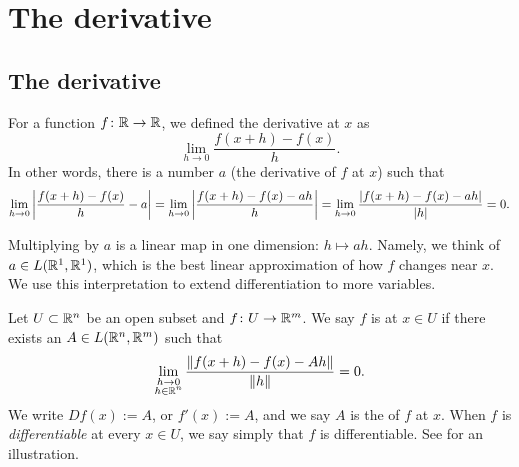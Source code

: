 
\sectionnewpage
\section{The derivative}
\label{sec:svtheder}


\subsection{The derivative}

For a function $f \colon {\mathbb{R}} \to {\mathbb{R}}$, we defined
the derivative at $x$ as
\begin{equation*}
\lim_{h \to 0} \frac{f(x+h)-f(x)}{h} .
\end{equation*}
In other words, there is a number $a$ (the derivative of $f$ at $x$) such that
\begin{equation*}
\lim_{h \to 0} \left\lvert {\frac{f(x+h)-f(x)}{h} - a} \right\rvert =
\lim_{h \to 0} \left\lvert {\frac{f(x+h)-f(x) - ah}{h}} \right\rvert
=
\lim_{h \to 0} \frac{\lvert {f(x+h)-f(x) - ah} \rvert}{\lvert {h} \rvert}
= 0.
\end{equation*}

Multiplying by $a$ is a linear map in one dimension:
$h \mapsto ah$.
Namely,
we think of $a \in L({\mathbb{R}}^1,{\mathbb{R}}^1)$, 
which is the best linear approximation of
how $f$ changes near $x$.  We use this interpretation
to extend differentiation to more variables.

\begin{defn}
Let $U \subset {\mathbb{R}}^n$ be an open subset and $f \colon U \to {\mathbb{R}}^m$.  We
say $f$ is \emph{} at $x \in U$ if there exists
an $A \in L({\mathbb{R}}^n,{\mathbb{R}}^m)$ such that
\begin{equation*}
\lim_{\substack{h \to 0\\h\in {\mathbb{R}}^n}}
\frac{\lVert {f(x+h)-f(x) - Ah} \rVert}{\lVert {h} \rVert} = 0 .
\end{equation*}
We write $Df(x) := A$, or $f'(x) := A$, and
we say $A$ is the \emph{} of $f$ at $x$.
When $f$ is \emph{differentiable} at
every $x \in U$, we say simply that $f$ is differentiable.  See
 for an illustration.
\end{defn}

